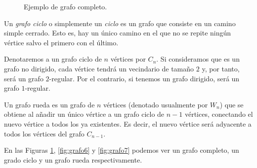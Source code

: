 \begin{figure}[H]
\centering
{}
\caption{Ejemplo de grafo completo.}
	\label{fig:grafo5}
\end{figure}

\begin{definition}
Un \emph{grafo ciclo} o simplemente un \emph{ciclo} es un grafo que consiste en un camino simple cerrado. Esto es, hay un único camino en el que no se repite ningún vértice salvo el primero con el último.

Denotaremos a un grafo ciclo de $n$ vértices por $C_n$. Si consideramos que es un grafo no dirigido, cada vértice tendrá un vecindario de tamaño $2$ y, por tanto, será un grafo $2$-regular. Por el contrario, si tenemos un grafo dirigido, será un grafo $1$-regular.
\end{definition}

\begin{definition}
Un grafo rueda es un grafo de $n$ vértices (denotado usualmente por $W_n$) que se obtiene al añadir un único vértice a un grafo ciclo de $n-1$ vértices, conectando el nuevo vértice a todos los ya existentes. Es decir, el nuevo vértice será adyacente a todos los vértices del grafo $C_{n-1}$.
\end{definition}

\begin{exampleth}
En las Figuras \ref{fig:grafo5}, \ref{fig:grafo6} y \ref{fig:grafo7} podemos ver un grafo completo, un grado ciclo y un grafo rueda respectivamente.
\end{exampleth}

